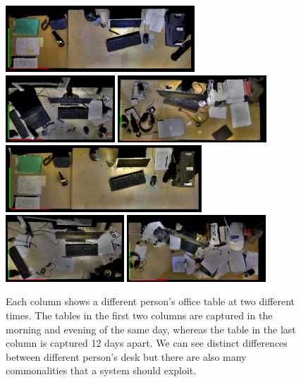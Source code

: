 \documentclass[letterpaper, 10 pt, conference]{ieeeconf}  %
\begin{document}
\begin{figure}[bhtp]
\begin{center}
\includegraphics[height=2.5cm]{David_Mor_131110} \quad
\includegraphics[height=2.5cm]{Nils_Mor_131111} \quad
\includegraphics[height=2.5cm]{Puren_Eve_131029}\\ \smallskip
\includegraphics[height=2.5cm]{David_Eve_131110} \enskip
\includegraphics[height=2.5cm]{Nils_Eve_131111} \enskip
\includegraphics[height=2.5cm]{Puren_Mor_131110}
\caption{Each column shows a different person's office table at two different times. The tables in the first two columns are captured in the morning and evening of the same day, whereas the table in the last column is captured 12 days apart. We can see distinct differences between different person's desk but there are also many commonalities that a system should exploit.}
\label{fig:Example Scenes}
\end{center}
\end{figure}
\end{document}
